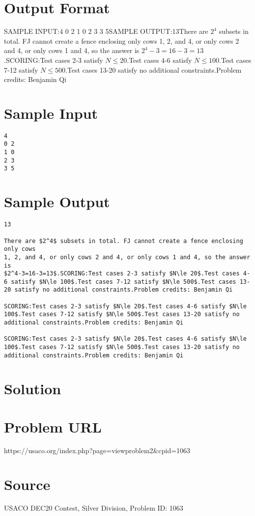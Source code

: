 \documentclass[12pt]{article}
\begin{document}
\section*{Output Format}
SAMPLE INPUT:4
0 2
1 0
2 3
3 5SAMPLE OUTPUT:13There are $2^4$ subsets in total. FJ cannot create a fence enclosing only cows
1, 2, and 4, or only cows 2 and 4, or only cows 1 and 4, so the answer is
$2^4-3=16-3=13$.SCORING:Test cases 2-3 satisfy $N\le 20$.Test cases 4-6 satisfy $N\le 100$.Test cases 7-12 satisfy $N\le 500$.Test cases 13-20 satisfy no additional constraints.Problem credits: Benjamin Qi

\section*{Sample Input}
\begin{verbatim}
4
0 2
1 0
2 3
3 5
\end{verbatim}

\section*{Sample Output}
\begin{verbatim}
13

There are $2^4$ subsets in total. FJ cannot create a fence enclosing only cows
1, 2, and 4, or only cows 2 and 4, or only cows 1 and 4, so the answer is
$2^4-3=16-3=13$.SCORING:Test cases 2-3 satisfy $N\le 20$.Test cases 4-6 satisfy $N\le 100$.Test cases 7-12 satisfy $N\le 500$.Test cases 13-20 satisfy no additional constraints.Problem credits: Benjamin Qi

SCORING:Test cases 2-3 satisfy $N\le 20$.Test cases 4-6 satisfy $N\le 100$.Test cases 7-12 satisfy $N\le 500$.Test cases 13-20 satisfy no additional constraints.Problem credits: Benjamin Qi

SCORING:Test cases 2-3 satisfy $N\le 20$.Test cases 4-6 satisfy $N\le 100$.Test cases 7-12 satisfy $N\le 500$.Test cases 13-20 satisfy no additional constraints.Problem credits: Benjamin Qi
\end{verbatim}

\section*{Solution}


\section*{Problem URL}
https://usaco.org/index.php?page=viewproblem2&cpid=1063

\section*{Source}
USACO DEC20 Contest, Silver Division, Problem ID: 1063
\end{document}
